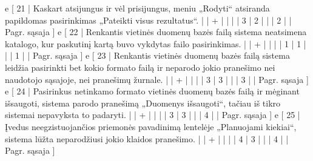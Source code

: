 {%
  e [ 21 | Kaskart atsijungus ir vėl prisijungus, meniu „Rodyti“ atsiranda papildomas
  pasirinkimas „Pateikti visus rezultatus“.
                    |   | + |   |   |   | 3 | 2 |   |   | 2 |      | Pagr. sąsaja ]
  e [ 22 | Renkantis vietinės duomenų bazės failą sistema neatsimena katalogo,
  kur paskutinį kartą buvo vykdytas failo pasirinkimas.
                    |   | + |   |   |   | 1 | 1 |   |   | 1 |      | Pagr. sąsaja ]
  e [ 23 | Renkantis vietinės duomenų bazės failą sistema leidžia pasirinkti bet kokio
  formato failą ir neparodo jokio pranešimo nei naudotojo sąsajoje, nei pranešimų
  žurnale.
                    |   | + |   |   |   | 3 | 3 |   |   | 3 |      | Pagr. sąsaja ]
  e [ 24 | Pasirinkus netinkamo formato vietinės duomenų bazės failą ir mėginant
  išsaugoti, sistema parodo pranešimą „Duomenys išsaugoti“, tačiau iš tikro sistemai
  nepavyksta to padaryti.
                    |   | + |   |   |   | 3 | 3 |   |   | 4 |      | Pagr. sąsaja ]
  e [ 25 | Įvedus neegzistuojančios priemonės pavadinimą lentelėje „Planuojami kiekiai“,
  sistema lūžta neparodžiusi jokio klaidos pranešimo.
                    |   | + |   |   |   | 4 | 3 |   |   | 4 |      | Pagr. sąsaja ]
}
